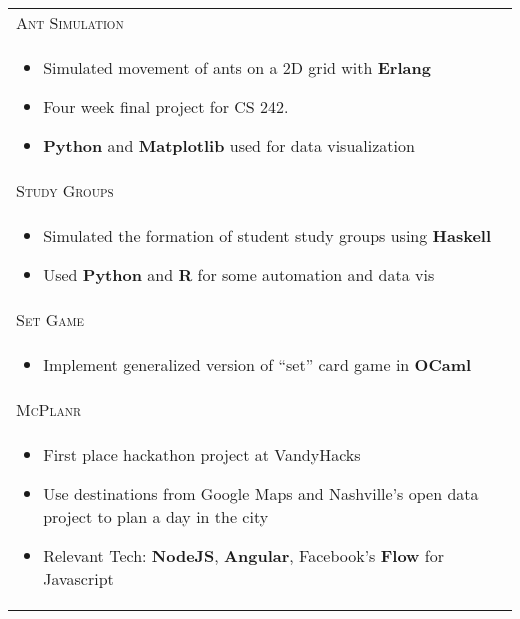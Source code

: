 \documentclass[letterpaper,10pt]{article}
\begin{document}
\begin{tabular}{p{15.8cm}}
    \textsc{Ant Simulation} \\

    \vspace{-2mm}
    \begin{itemize}
        \item
            Simulated movement of ants on a 2D grid with \textbf{Erlang}
        \item
            Four week final project for CS 242.
        \item
            \textbf{Python} and \textbf{Matplotlib} used for data visualization
    \end{itemize} \\

    \textsc{Study Groups} \\
    \vspace{-2mm}
    \begin{itemize}
        \item
            Simulated the formation of student study groups using
            \textbf{Haskell}
        \item
            Used \textbf{Python} and \textbf{R} for some automation and data vis
    \end{itemize} \\

    \textsc{Set Game} \\
    \vspace{-2mm}
    \begin{itemize}
        \item
            Implement generalized version of  ``set'' card game in \textbf{OCaml}
    \end{itemize} \\

    \textsc{McPlanr} \\
    \vspace{-2mm}
    \begin{itemize}
        \item
            First place hackathon project at VandyHacks
        \item
            Use destinations from Google Maps and Nashville's open data project
            to plan a day in the city
        \item
            Relevant Tech: \textbf{NodeJS}, \textbf{Angular}, Facebook's
            \textbf{Flow} for Javascript
    \end{itemize} \\

\end{tabular}
\end{document}
